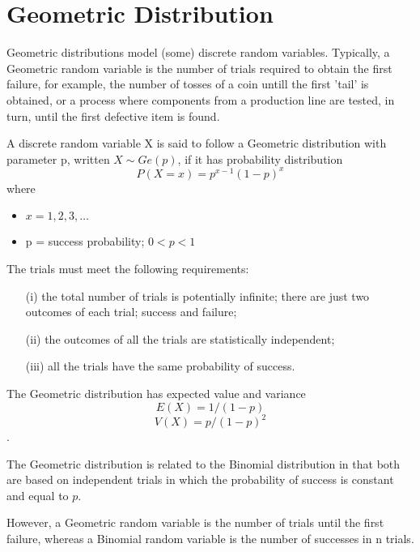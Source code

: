 \documentclass[]{article}
\begin{document}
\section*{Geometric Distribution}
Geometric distributions model (some) discrete random variables. Typically, a Geometric random variable is the number of trials required to obtain the first failure, for example, the number of tosses of a coin untill the first 'tail' is obtained, or a process where components from a production line are tested, in turn, until the first defective item is found.

A discrete random variable X is said to follow a Geometric distribution with parameter p, written $X \sim Ge(p)$, if it has probability distribution
\[P(X=x) = p^{x-1}(1-p)^x\]
where
\begin{itemize}
\item $x = 1, 2, 3, \ldots$
\item p = success probability; $0 < p < 1$
\end{itemize}
The trials must meet the following requirements:

\begin{itemize}
\item[(i)] the total number of trials is potentially infinite;
there are just two outcomes of each trial; success and failure;
\item[(ii)] the outcomes of all the trials are statistically independent;
\item[(iii)] all the trials have the same probability of success.
\end{itemize}
The Geometric distribution has expected value and variance  \[E(X)= 1/(1-p)\] \[V(X)=p/{(1-p)^2}\].

The Geometric distribution is related to the Binomial distribution in that both are based on independent trials in which the probability of success is constant and equal to $p$. 

However, a Geometric random variable is the number of trials until the first failure, whereas a Binomial random variable is the number of successes in n trials.
\end{document}
